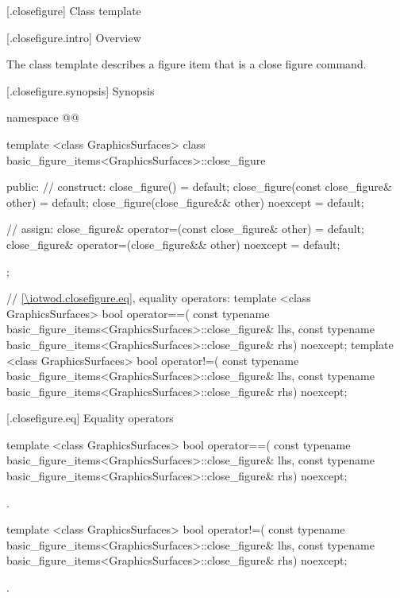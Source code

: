  [\iotwod.closefigure] {Class template }

 [\iotwod.closefigure.intro] {Overview}

\pnum
{}
The class template  describes a figure item that is a close figure command.

 [\iotwod.closefigure.synopsis] {Synopsis}
\begin{codeblock}
namespace @\fullnamespace{}@ {
  template <class GraphicsSurfaces>
  class basic_figure_items<GraphicsSurfaces>::close_figure {
  public:
    // construct:
    close_figure() = default;
    close_figure(const close_figure& other) = default;
    close_figure(close_figure&& other) noexcept = default;

    // assign:
    close_figure& operator=(const close_figure& other) = default;
    close_figure& operator=(close_figure&& other) noexcept = default;
  };

  // \ref{\iotwod.closefigure.eq}, equality operators:
  template <class GraphicsSurfaces>
  bool operator==(
    const typename basic_figure_items<GraphicsSurfaces>::close_figure& lhs,
    const typename basic_figure_items<GraphicsSurfaces>::close_figure& rhs) 
    noexcept;  
  template <class GraphicsSurfaces>
  bool operator!=(
    const typename basic_figure_items<GraphicsSurfaces>::close_figure& lhs,
    const typename basic_figure_items<GraphicsSurfaces>::close_figure& rhs) 
    noexcept;
}
\end{codeblock}

 [\iotwod.closefigure.eq] {Equality operators}%

%
\begin{itemdecl}
template <class GraphicsSurfaces>
bool operator==(
  const typename basic_figure_items<GraphicsSurfaces>::close_figure& lhs,
  const typename basic_figure_items<GraphicsSurfaces>::close_figure& rhs)
  noexcept;
\end{itemdecl}
\begin{itemdescr}
\pnum
\returns {}.
\end{itemdescr}

%
\begin{itemdecl}
template <class GraphicsSurfaces>
bool operator!=(
  const typename basic_figure_items<GraphicsSurfaces>::close_figure& lhs,
  const typename basic_figure_items<GraphicsSurfaces>::close_figure& rhs)
  noexcept;
\end{itemdecl}
\begin{itemdescr}
\pnum
\returns {}.
\end{itemdescr}
